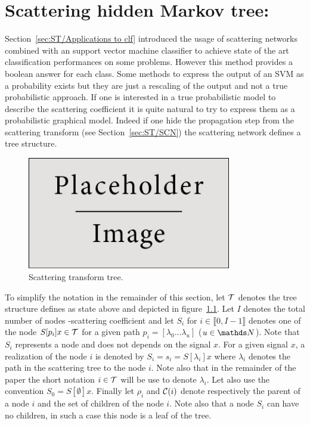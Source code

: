\documentclass[a4paper,11pt]{report}
\begin{document}
		
\chapter{Scattering hidden Markov tree:}
  \label{chap:SHMT}
  Section~\ref{sec:ST/Applications to clf} introduced the usage of scattering networks combined with an support vector machine classifier to achieve state of the art classification performances on some problems. However this method provides a boolean answer for each class. Some methods to express the output of an SVM as a probability exists \cite{platt1999probabilistic} but they are just a rescaling of the output and not a true probabilistic approach. If one is interested in a true probabilistic model to describe the scattering coefficient it is quite natural to try to express them as a probabilistic graphical model. Indeed if one hide the propagation step from the scattering transform (see Section~\ref{sec:ST/SCN}) the scattering network defines a tree structure. \\

	\begin{figure}
			\begin{center}
				\includegraphics[width=3.5in]{placeholder.jpg}
				\caption{Scattering transform tree.} %
				\label{fig:ST tree}
			\end{center}
	\end{figure}
  
  To simplify the notation in the remainder of this section, let $\mathcal{T}$ denotes the tree  structure defines as state above and depicted in figure~\ref{fig:ST tree}. Let $I$ denotes the total number of nodes -\ie scattering coefficient and let $S_{i}$ for $i \in \llbracket0, I-1 \rrbracket$ denotes one of the node $S[p_{i}]x \in \mathcal{T}$ for a given path $p_{i} = [\lambda_{0} ... \lambda_{u}]$ ($u\in \dsN$). Note that $S_{i}$ represents a node and does not depends on the signal $x$. For a given signal $x$, a realization of the node $i$ is denoted by $S_{i}= s_{i} = S[\lambda_{i}]x$ where $\lambda_{i}$ denotes the path in the scattering tree to the node $i$. Note also that in the remainder of the paper the short notation $i \in \mathcal{T}$ will be use to denote $\lambda_{i}$. Let also use the convention $S_{0} = S[\emptyset]x$. Finally let $\rho_{i}$ and $\mathcal{C}(i)$ denote respectively the parent of a node $i$ and the set of children of the node $i$. Note also that a node $S_{i}$ can have no children, in such a case this node is a leaf of the tree.\\
  
\end{document}
